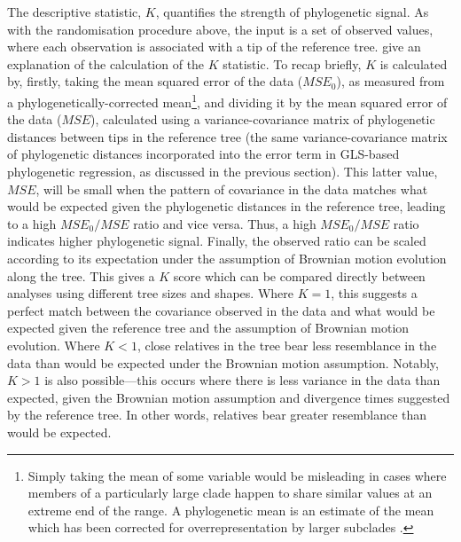 The descriptive statistic, \(K\), quantifies the strength of phylogenetic signal. As with the randomisation procedure above, the input is a set of observed values, where each observation is associated with a tip of the reference tree. \textcite[p.~722]{blomberg_testing_2003} give an explanation of the calculation of the \(K\) statistic. To recap briefly, \(K\) is calculated by, firstly, taking the mean squared error of the data (\(MSE_0\)), as measured from a phylogenetically-corrected mean\footnote{Simply taking the mean of some variable would be misleading in cases where members of a particularly large clade happen to share similar values at an extreme end of the range. A phylogenetic mean is an estimate of the mean which has been corrected for overrepresentation by larger subclades \autocite[see][]{garland_polytomies_1999}.}, and dividing it by the mean squared error of the data (\(MSE\)), calculated using a variance-covariance matrix of phylogenetic distances between tips in the reference tree (the same variance-covariance matrix of phylogenetic distances incorporated into the error term in GLS-based phylogenetic regression, as discussed in the previous section). This latter value, \(MSE\), will be small when the pattern of covariance in the data matches what would be expected given the phylogenetic distances in the reference tree, leading to a high \(MSE_0/MSE\) ratio and vice versa. Thus, a high \(MSE_0/MSE\) ratio indicates higher phylogenetic signal. Finally, the observed ratio can be scaled according to its expectation under the assumption of Brownian motion evolution along the tree. This gives a \(K\) score which can be compared directly between analyses using different tree sizes and shapes. Where \(K = 1\), this suggests a perfect match between the covariance observed in the data and what would be expected given the reference tree and the assumption of Brownian motion evolution. Where \(K < 1\), close relatives in the tree bear less resemblance in the data than would be expected under the Brownian motion assumption. Notably, \(K > 1\) is also possible---this occurs where there is less variance in the data than expected, given the Brownian motion assumption and divergence times suggested by the reference tree. In other words, relatives bear greater resemblance than would be expected.

